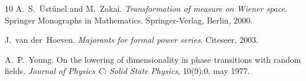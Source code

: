 \documentclass[a4paper,10pt]{article}
\newcommand{\tmtextit}[1]{{\itshape{#1}}}
\begin{document}
\begin{thebibliography}{10}
  A.~S.~{\"U}st{\"u}nel  and  M.~Zakai.
  {\newblock}\tmtextit{Transformation of measure on Wiener space}.
  {\newblock}Springer Monographs in Mathematics. Springer-Verlag, Berlin,
  2000.{\newblock}
  
  J.~van der~Hoeven.
  {\newblock}\tmtextit{Majorants for formal power series}.
  {\newblock}Citeseer, 2003.{\newblock}
  
  A.~P.~Young. {\newblock}On the lowering of
  dimensionality in phase transitions with random fields.
  {\newblock}\tmtextit{Journal of Physics C: Solid State Physics}, 10(9):0,
  may 1977.{\newblock}
\end{thebibliography}
\end{document}
